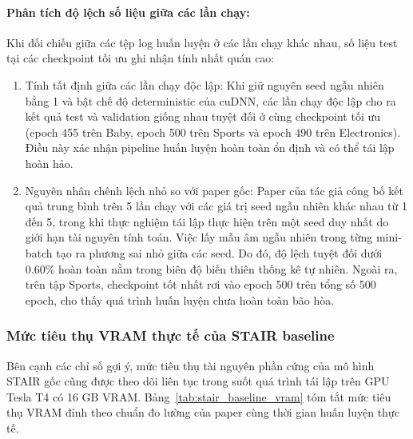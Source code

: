 \paragraph{Phân tích độ lệch số liệu giữa các lần chạy:}
Khi đối chiếu giữa các tệp log huấn luyện ở các lần chạy khác nhau, số liệu test tại các checkpoint tối ưu ghi nhận tính nhất quán cao:
\begin{enumerate}[leftmargin=*]
    \item Tính tất định giữa các lần chạy độc lập: Khi giữ nguyên seed ngẫu nhiên bằng 1 và bật chế độ deterministic của cuDNN, các lần chạy độc lập cho ra kết quả test và validation giống nhau tuyệt đối ở cùng checkpoint tối ưu (epoch 455 trên Baby, epoch 500 trên Sports và epoch 490 trên Electronics). Điều này xác nhận pipeline huấn luyện hoàn toàn ổn định và có thể tái lập hoàn hảo.
    \item Nguyên nhân chênh lệch nhỏ so với paper gốc: Paper của tác giả công bố kết quả trung bình trên 5 lần chạy với các giá trị seed ngẫu nhiên khác nhau từ 1 đến 5, trong khi thực nghiệm tái lập thực hiện trên một seed duy nhất do giới hạn tài nguyên tính toán. Việc lấy mẫu âm ngẫu nhiên trong từng mini-batch tạo ra phương sai nhỏ giữa các seed. Do đó, độ lệch tuyệt đối dưới 0.60\% hoàn toàn nằm trong biên độ biến thiên thống kê tự nhiên. Ngoài ra, trên tập Sports, checkpoint tốt nhất rơi vào epoch 500 trên tổng số 500 epoch, cho thấy quá trình huấn luyện chưa hoàn toàn bão hòa.
\end{enumerate}

\subsubsection{Mức tiêu thụ VRAM thực tế của STAIR baseline}

Bên cạnh các chỉ số gợi ý, mức tiêu thụ tài nguyên phần cứng của mô hình STAIR gốc cũng được theo dõi liên tục trong suốt quá trình tái lập trên GPU Tesla T4 có 16 GB VRAM. Bảng~\ref{tab:stair_baseline_vram} tóm tắt mức tiêu thụ VRAM đỉnh theo chuẩn đo lường của paper cùng thời gian huấn luyện thực tế.

\begin{table}[H]
\centering
\small
\setlength{\tabcolsep}{5pt}
\renewcommand{\arraystretch}{1.15}
\caption{Mức tiêu thụ VRAM đỉnh và thời gian huấn luyện của STAIR baseline trên GPU Tesla T4.}
\label{tab:stair_baseline_vram}
\end{table}


